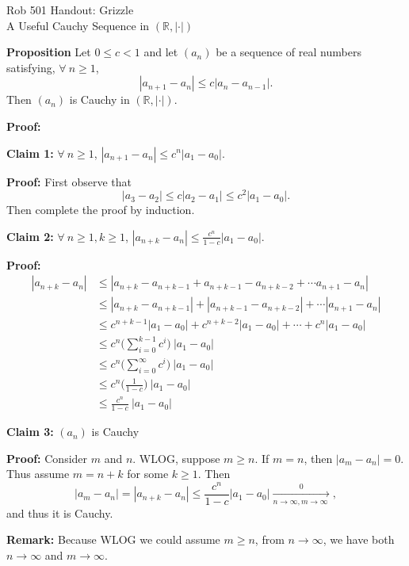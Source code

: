 \documentclass[letterpaper]{article}
\newcommand{\real}{\mathbb R}  %
\newcommand{\ak}[1]{a_{#1}}
\begin{document}
\baselineskip=48pt  %


\setlength{\parskip}{.3in}
\setlength{\itemsep}{.3in}

\pagestyle{plain}

{\Large \bf
\begin{center}
Rob 501 Handout: Grizzle \\
A Useful Cauchy Sequence in $(\real, |\cdot|)$
\end{center}
}



\Large

\textbf{Proposition} Let $0 \le c <1$ and let $(a_n)$ be a sequence of real numbers satisfying, $\forall~n\ge 1$,
 $$|\ak{n+1}-\ak{n}| \le c | \ak{n}-\ak{n-1}|. $$
 Then $(a_n)$ is Cauchy in $(\real, |\cdot|)$.

\textbf{Proof:}

\textbf{Claim 1:} $\forall ~n\ge 1$, $|\ak{n+1}-\ak{n}| \le c^n |a_1-a_0|$.

\textbf{Proof:} First observe that $$|\ak{3}-\ak{2}|\le c|\ak{2}-\ak{1}| \le c^2|a_1-a_0|.$$ Then complete the proof by induction.

\textbf{Claim 2:} $\forall ~n\ge 1, k \ge 1$, $|\ak{n+k}-\ak{n}| \le \frac{c^n}{1-c} |a_1-a_0|$.

\textbf{Proof:}
\begin{align*}
|\ak{n+k}-\ak{n}| &\le | \ak{n+k}-\ak{n+k-1} + \ak{n+k-1}-\ak{n+k-2} +\cdots \ak{n+1}-\ak{n}| \\
&\le | \ak{n+k}-\ak{n+k-1}| + |\ak{n+k-1}-\ak{n+k-2}| +\cdots |\ak{n+1}-\ak{n}| \\
&\le c^{n+k-1}|a_1-a_0| + c^{n+k-2}|a_1-a_0| + \cdots + c^n |a_1-a_0|  \\
&\le c^n \big( \sum_{i=0}^{k-1} c^i \big)~ |a_1-a_0| \\
&\le c^n \big( \sum_{i=0}^{\infty} c^i \big)~ |a_1-a_0| \\
&\le c^n \big( \frac{1}{1-c} \big) ~ |a_1-a_0|\\
&\le  \frac{c^n }{1-c}~|a_1-a_0|
\end{align*}

\textbf{Claim 3:} $(a_n)$ is Cauchy

\textbf{Proof:} Consider $m$ and $n$. WLOG, suppose $m \ge n$. If $m=n$, then $|a_m-a_n|=0$. Thus assume $m=n+k$ for some $k\ge1$. Then
$$|a_m-a_n|=|a_{n+k}-a_n|\le \frac{c^n}{1-c} |a_1-a_0| \xrightarrow[n\to \infty, m\to \infty~]0,$$
and thus it is Cauchy.


\textbf{Remark:} Because WLOG we could assume $m\ge n$, from $n\to \infty$, we have both $n\to \infty$ and $ m\to \infty$.
\end{document}
